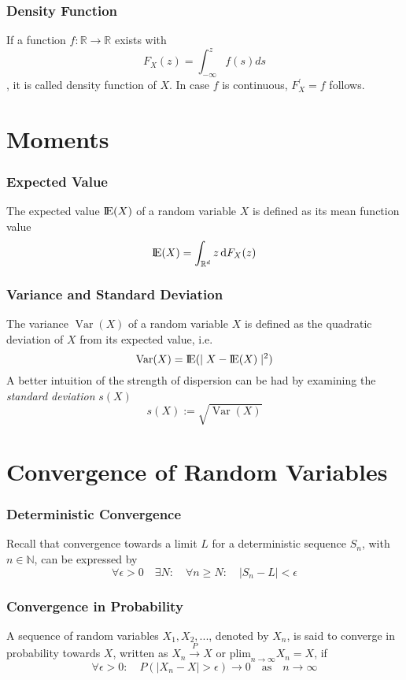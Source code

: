 \documentclass{beamer}
\newcommand*\diff{\mathop{}\!\mathrm{d}}
\newcommand{\E}{\mbox{I\negthinspace E}}
\DeclareMathOperator{\Var}{Var}
\begin{document}
\begin{frame}
\frametitle{Density Function}

If a function $f:\mathbb{R} \to \mathbb{R}$ exists with
\[
F_X(z) = \int_{- \infty}^{z} f(s) ds
\]
, it is called density function of $X$. In case $f$ is continuous, $F_X^\prime = f$ follows.

\end{frame}


\section{Moments} 


\begin{frame}
\frametitle{Expected Value}

 The expected value $\E (X)$ of a random variable $X$ is defined as its mean function value
\[
\E (X) = \int_{\mathbb{R}^d } z \diff F_X(z)
\]

\end{frame}


\begin{frame}
\frametitle{Variance and Standard Deviation}
The variance $\Var (X)$ of a random variable $X$ is defined as the quadratic deviation of $X$ from its expected value, i.e.
\[
\Var (X) = \E (\mid X - \E (X) \mid ^2)
\]
A better intuition of the strength of dispersion can be had by examining the \textit{standard deviation} $s(X)$
\[
s(X) := \sqrt{\Var (X)}
\]

\end{frame}


\section{Convergence of Random Variables} 


\begin{frame}
\frametitle{Deterministic Convergence}

Recall that convergence towards a limit $L$ for a deterministic sequence $S_n$, with $n \in \mathbb{N}$, can be expressed by
\[
\forall \epsilon > 0 \quad \exists N: \quad \forall n \geq N : \quad|S_n - L| < \epsilon
\]

\end{frame}


\begin{frame}
\frametitle{Convergence in Probability}

A sequence of random variables $X_1, X_2, ...$, denoted by $X_n$, is said to converge in probability towards $X$, written as $X_n \overset{P}\to X$ or $\text{plim}_{n \to \infty} X_n  = X$, if
\[
\forall \epsilon > 0 :\quad P(|X_n - X| > \epsilon) \to 0 \quad \text{as} \quad n \to \infty
\]

\end{frame}
\end{document}
